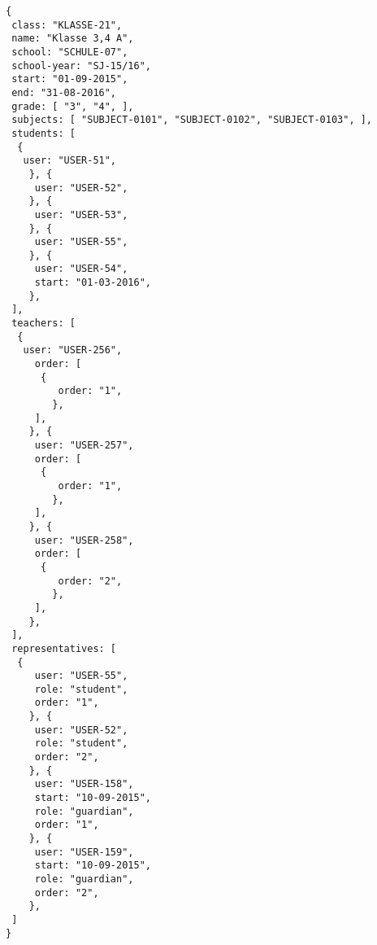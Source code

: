 
\begin{lstlisting}[caption={Klassen-Datenmodell Beispiel 3: Jahrgangsübergreifende Klasse},frame=tlrb]
{
 class: "KLASSE-21",
 name: "Klasse 3,4 A",
 school: "SCHULE-07",
 school-year: "SJ-15/16",
 start: "01-09-2015",
 end: "31-08-2016",
 grade: [ "3", "4", ],
 subjects: [ "SUBJECT-0101", "SUBJECT-0102", "SUBJECT-0103", ],
 students: [
  { 
   user: "USER-51",
	}, { 
	 user: "USER-52",
	}, { 
	 user: "USER-53",
	}, { 
	 user: "USER-55",
	}, { 
	 user: "USER-54",
	 start: "01-03-2016",
	},
 ],
 teachers: [
  { 
   user: "USER-256",
	 order: [
	  {
		 order: "1",
		},
	 ],
	}, { 
	 user: "USER-257",
	 order: [
	  {
		 order: "1",
		},
	 ],
	}, { 
	 user: "USER-258",
	 order: [
	  {
		 order: "2",
		},
	 ],
	},
 ],
 representatives: [
  {
	 user: "USER-55",
	 role: "student",
	 order: "1",	 
	}, {
	 user: "USER-52",
	 role: "student",
	 order: "2",	 
	}, {
	 user: "USER-158",
	 start: "10-09-2015",
	 role: "guardian",
	 order: "1",	 
	}, {
	 user: "USER-159",
	 start: "10-09-2015",
	 role: "guardian",
	 order: "2",	 
	},  
 ]
}
\end{lstlisting}